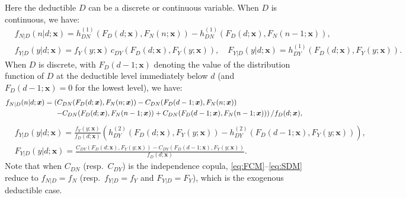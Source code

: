 \documentclass[11pt]{article}
\begin{document}
Here the deductible $D$ can be a discrete or continuous variable. When $D$ is continuous, we have:
{
\begin{align} \label{eq:FCM}
	&f_{N|D}(n|d;\bm{x}) = h^{(1)}_{DN}(F_D(d;\bm{x}),F_{N}(n;\bm{x})) - h^{(1)}_{DN}(F_D(d;\bm{x}),F_{N}(n-1;\bm{x})),\\
	\label{eq:SCM} &f_{Y|D}(y|d;\bm{x}) =  f_{Y}(y;\bm{x})\, c_{DY}(F_D(d;\bm{x}),F_{Y}(y;\bm{x})), \quad F_{Y|D}(y|d;\bm{x}) = h^{(1)}_{DY}(F_D(d;\bm{x}),F_{Y}(y;\bm{x})).
\end{align}
}
When $D$ is discrete, {with $F_D(d-1;\bm{x})$ denoting the value of the distribution function of $D$ at the deductible level immediately below $d$ (and $F_D(d-1;\bm{x})=0$ for the lowest level)}, we have:
{
\begin{equation} \label{eq:FDM}
\begin{aligned}
	&f_{N|D}(n|d;\bm{x})  = \left(C_{DN}(F_D(d;\bm{x}),F_{N}(n;\bm{x})) - C_{DN}(F_D(d-1;\bm{x}),F_{N}(n;\bm{x}))\right. \\
	& \hspace{2.4cm}\left.-C_{DN}(F_D(d;\bm{x}),F_{N}(n-1;\bm{x})) + C_{DN}(F_D(d-1;\bm{x}),F_{N}(n-1;\bm{x}))\right)/f_D(d;\bm{x}),
\end{aligned}
\end{equation}
\vspace{-13pt}
\begin{equation} \label{eq:SDM}
\begin{aligned}
	&f_{Y|D}(y|d;\bm{x}) = \frac{f_{Y}(y;\bm{x})}{f_{D}(d;\bm{x})}\left(h^{(2)}_{DY}(F_D(d;\bm{x}),F_{Y}(y;\bm{x})) - h^{(2)}_{DY}(F_D(d-1;\bm{x}),F_{Y}(y;\bm{x}))\right),\\
	&F_{Y|D}(y|d;\bm{x}) = \frac{C_{DY}(F_D(d;\bm{x}),F_{Y}(y;\bm{x})) - C_{DY}(F_D(d-1;\bm{x}),F_{Y}(y;\bm{x}))}{f_{D}(d;\bm{x})}.
\end{aligned}
\end{equation}
}
{Note that when $C_{DN}$ (resp.\ $C_{DY}$) is the independence copula, \eqref{eq:FCM}--\eqref{eq:SDM} reduce to $f_{N|D}=f_{N}$ (resp.\ $f_{Y|D}=f_{Y}$ and $F_{Y|D}=F_{Y}$), which is the exogenous deductible case.}

\end{document}
